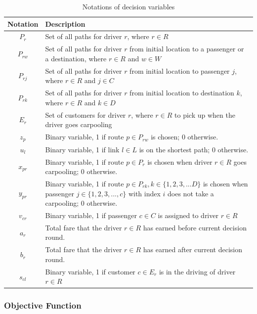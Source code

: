 \begin{table}[ht]
  \centering
  \caption{Notations of decision variables}
  \begin{tabularx}{\textwidth}{cX}
  \toprule
  Notation & Description \\
  \midrule
    $P_r$ & Set of all paths for driver $r$, where $r \in R$ \\
    $P_{rw}$ & Set of all paths for driver $r$ from initial location to a passenger or a destination, where $r \in R$ and $w \in W$ \\
    $P_{rj}$ & Set of all paths for driver $r$ from initial location to passenger $j$, where $r \in R$ and $j \in C$ \\
    $P_{rk}$ & Set of all paths for driver $r$ from initial location to destination $k$, where $r \in R$ and $k \in D$ \\
    $E_r$ & Set of customers for driver $r$, where $r \in R$ to pick up when the driver goes carpooling \\
    $z_p$ & Binary variable, 1 if route $p \in P_{rw}$ is chosen; 0 otherwise. \\
    $u_l$ & Binary variable, 1 if link $l \in L$ is on the shortest path; 0 otherwise. \\
    $x_{pr}$ & Binary variable, 1 if route $p \in P_r$ is chosen when driver $r \in R$ goes carpooling; 0 otherwise. \\
    $y_{pr}$ & Binary variable, 1 if route $p \in P_{rk}, k \in \{1,2,3,...D\}$ is chosen when passenger $j \in \{1,2,3,...,c\}$ with index $i$ does not take a carpooling; 0 otherwise. \\
    $v_{cr}$ & Binary variable, 1 if passenger $c \in C$ is assigned to driver $r \in R$ \\
    $a_r$ & Total fare that the driver $r \in R$ has earned before current decision round. \\
    $b_r$ & Total fare that the driver $r \in R$ has earned after current decision round. \\
    $s_{cl}$ & Binary variable, 1 if customer $c \in E_r$ is in the driving of driver $r \in R$ \\
  \bottomrule
  \end{tabularx}
\end{table}  
\newpage

\subsubsection*{Objective Function}

